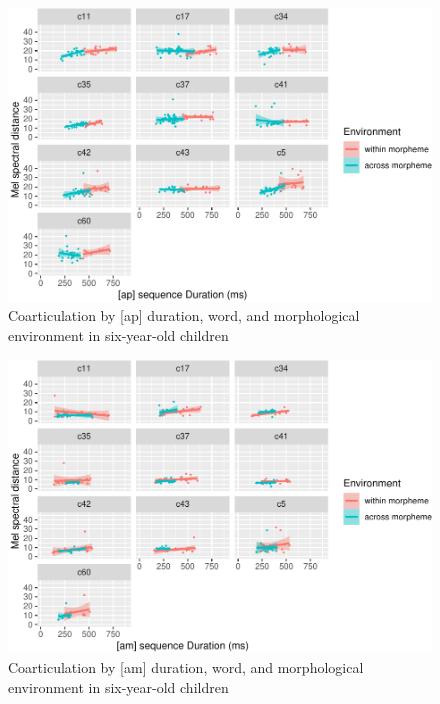 \documentclass[a4paper,man,floatsintext,natbib,donotrepeattitle, apacite]{apa6}
\begin{document}
\begin{figure}
\centering
\includegraphics{3_ch3_results_files/figure-latex/six-facet-ap-1.pdf}
\caption{\label{fig:six-facet-ap}Coarticulation by {[}ap{]} duration, word, and morphological environment in six-year-old children}
\end{figure}

\begin{figure}
\centering
\includegraphics{3_ch3_results_files/figure-latex/six-facet-am-1.pdf}
\caption{\label{fig:six-facet-am}Coarticulation by {[}am{]} duration, word, and morphological environment in six-year-old children}
\end{figure}
\end{document}
